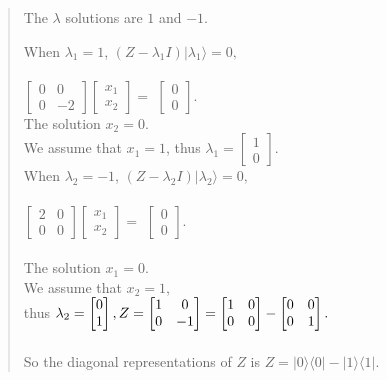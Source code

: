 \documentclass[UTF8]{ctexart}
\begin{document}
\begin{quote}
	The $\lambda$ solutions are $1$ and $-1$.
	
	When $\lambda_{1}=1$,
    	$(Z-\lambda_{1} I)|\lambda_{1}\rangle=0,$ \\  \\ 
	$\begin{bmatrix}0&0\\0&-2\end{bmatrix}\begin{bmatrix}x_{1}\\x_{2}\end{bmatrix}=$
	$\begin{bmatrix}0\\0\end{bmatrix}$. \\  
	
	The solution $x_{2}=0$. \\
	We  assume that $x_{1}=1$,
	thus $\lambda_{1}=\begin{bmatrix}1\\0\end{bmatrix}$. 
	\\
	When $\lambda_{2}=-1$,
    	$(Z-\lambda_{2} I )|\lambda_{2}\rangle=0,$ \\  \\
	$\begin{bmatrix}2&0\\0&0\end{bmatrix}\begin{bmatrix}x_{1}\\x_{2}\end{bmatrix}=$
	$\begin{bmatrix}0\\0\end{bmatrix}$. \\  \\ 
	The solution $x_{1}=0$.\\
	We  assume that $x_{2}=1$,  \\ 
	thus $\lambda_{2}=\begin{bmatrix}0\\1\end{bmatrix},
	 Z=\begin{bmatrix}1&0\\0&-1\end{bmatrix} 
	=\begin{bmatrix}1&0\\0&0\end{bmatrix}-\begin{bmatrix}0&0\\0&\-1\end{bmatrix}.$ \\ \\
	So the diagonal representations of $Z$ is 
	$Z=|0\rangle\langle 0 |-|1\rangle\langle 1|.$ \\  	
	

\end{quote}
\end{document}
